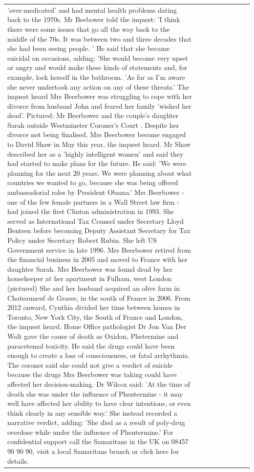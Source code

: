 \begin{table}[H]
\begin{tabular}{lllrlllll}
'over-medicated' and had mental health problems dating back to the 1970s. Mr Beebower told the inquest: 'I think there were some issues that go all the way back to the middle of the 70s. It was between two and three decades that she had been seeing people. ' He said that she became suicidal on occasions, adding: 'She would become very upset or angry and would make these kinds of statements and, for example, lock herself in the bathroom. 'As far as I'm aware she never undertook any action on any of these threats.' The inquest heard Mrs Beerbower was struggling to cope with her divorce from husband John and feared her family 'wished her dead'. Pictured: Mr Beerbower and the couple's daughter Sarah outside Westminster Coroner's Court . Despite her divorce not being finalised, Mrs Beerbower become engaged to David Shaw in May this year, the inquest heard. Mr Shaw described her as a 'highly intelligent women' and said they had started to make plans for the future. He said: 'We were planning for the next 20 years. We were planning about what countries we wanted to go, because she was being offered ambassadorial roles by President Obama.' Mrs Beerbower - one of the few female partners in a Wall Street law firm - had joined the first Clinton administration in 1993. She served as International Tax Counsel under Secretary Lloyd Bentsen before becoming Deputy Assistant Secretary for Tax Policy under Secretary Robert Rubin. She left US Government service in late 1996. Mrs Beerbower retired from the financial business in 2005 and moved to France with her daughter Sarah. Mrs Beerbower was found dead by her housekeeper at her apartment in Fulham, west London (pictured) She and her husband acquired an olive farm in Chateauneuf de Grasse, in the south of France in 2006. From 2012 onward, Cynthia divided her time between homes in Toronto, New York City, the South of France and London, the inquest heard. Home Office pathologist Dr Jon Van Der Walt gave the cause of death as Oxidon, Phetermine and paracetemol toxicity. He said the drugs could have been enough to create a loss of consciousness, or fatal arrhythmia. The coroner said she could not give a verdict of suicide because the drugs Mrs Beerbower was taking could have affected her decision-making. Dr Wilcox said: 'At the time of death she was under the influence of Phentermine - it may well have affected her ability to have clear intentions, or even think clearly in any sensible way.' She instead recorded a narrative verdict, adding: 'She died as a result of poly-drug overdose while under the influence of Phentermine.' For confidential support call the Samaritans in the UK on 08457 90 90 90, visit a local Samaritans branch or click here for details. \\

\end{tabular}
\end{table}
